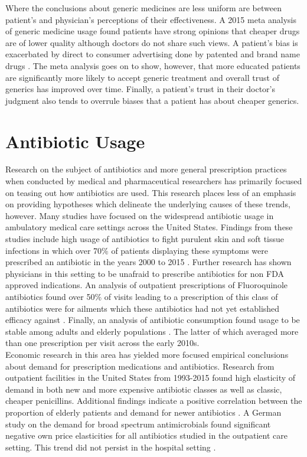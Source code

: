 \indent Where the conclusions about generic medicines are less uniform are between patient's and physician's perceptions of their effectiveness. A 2015 meta analysis of generic medicine usage found patients have strong opinions that cheaper drugs are of lower quality although doctors do not share such views\cite{dunne_what_2015}. A patient's bias is exacerbated by direct to consumer advertising done by patented and brand name drugs \cite{morgan_economics_2003}. The meta analysis goes on to show, however, that more educated patients are significantly more likely to accept generic treatment and overall trust of generics has improved over time. Finally, a patient's trust in their doctor's judgment also tends to overrule biases that a patient has about cheaper generics.

\section{Antibiotic Usage}
Research on the subject of antibiotics and more general prescription practices when conducted by medical and pharmaceutical researchers has primarily focused on teasing out how antibiotics are used. This research places less of an emphasis on providing hypotheses which delineate the underlying causes of these trends, however. Many studies have focused on the widespread antibiotic usage in ambulatory medical care settings across the United States. Findings from these studies include high usage of antibiotics to fight purulent skin and soft tissue infections in which over 70\% of patients displaying these symptoms were prescribed an antibiotic in the years 2000 to 2015 \cite{fritz_national_2020}. Further research has shown physicians in this setting to be unafraid to prescribe antibiotics for non FDA approved indications. An analysis of outpatient prescriptions of Fluoroquinole antibiotics found over 50\% of visits leading to a prescription of this class of antibiotics were for ailments which these antibiotics had not yet established efficacy against \cite{almalki_off-label_2016}. Finally, an analysis of antibiotic consumption found usage to be stable among adults \cite{roumie_trends_2005} and elderly populations \cite{kabbani_outpatient_2018}. The latter of which averaged more than one prescription per visit across the early 2010s.\\
\indent Economic research in this area has yielded more focused empirical conclusions about demand for prescription medications and antibiotics. Research from outpatient facilities in the United States from 1993-2015 found high elasticity of demand in both new and more expensive antibiotic classes as well as classic, cheaper penicillins. Additional findings indicate a positive correlation between the proportion of elderly patients and demand for newer antibiotics \cite{kianmehr_system_2020}. A German study on the demand for broad spectrum antimicrobials found significant negative own price elasticities for all antibiotics studied in the outpatient care setting. This trend did not persist in the hospital setting \cite{kaier_impact_2013}.\\

